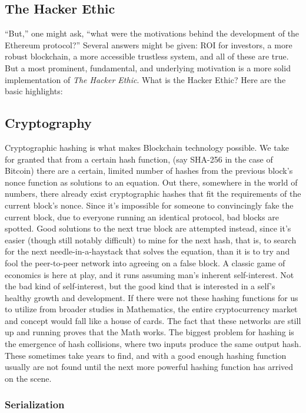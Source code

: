 \documentclass[10pt,a4paper,leqno,bibliography=totoc]{scrartcl}
\newenvironment{alphafootnotes}
{\par\edef\savedfootnotenumber{\number\value{footnote}}
\renewcommand{\thefootnote}{\alph{footnote}}
\setcounter{footnote}{0}}
{\par\setcounter{footnote}{\savedfootnotenumber}}
\begin{document}
\begin{alphafootnotes}
\begin{multicols*}{2}
		\subsection{The Hacker Ethic} ``But,'' one might ask, ``what were the motivations behind the development of the Ethereum protocol?'' Several answers might be given: ROI for investors, a more robust blockchain, a more accessible trustless system, and all of these are true. But a most prominent, fundamental, and underlying motivation is a more solid implementation of \textit{The Hacker Ethic}. What is the Hacker Ethic? Here are the basic highlights:
			
		\subsection{Cryptography} Cryptographic hashing is what makes Blockchain technology possible. We take for granted that from a certain hash function, (say SHA-256 in the case of Bitcoin) there are a certain, limited number of hashes from the previous block's nonce function as solutions to an equation. Out there, somewhere in the world of numbers, there already exist cryptographic hashes that fit the requirements of the current block's nonce. Since it's impossible for someone to convincingly fake the current block, due to everyone running an identical protocol, bad blocks are spotted. Good solutions to the next true block are attempted instead, since it's easier (though still notably difficult)  to mine for the next hash, that is, to search for the next needle-in-a-haystack that solves the equation, than it is to try and fool the peer-to-peer network into agreeing on a false block. A classic game of economics is here at play, and it runs assuming man's inherent self-interest. Not the bad kind of self-interest, but the good kind that is interested in a self's healthy growth and development. If there were not these hashing functions for us to utilize from broader studies in Mathematics, the entire cryptocurrency market and concept would fall like a house of cards. The fact that these networks are still up and running proves that the Math works. The biggest problem for hashing is the emergence of hash collisions, where two inputs produce the same output hash. These sometimes take years to find, and with a good enough hashing function usually are not found until the next more powerful hashing function has arrived on the scene.
			\subsubsection{Serialization}

\end{multicols*}
\end{alphafootnotes}
\end{document}
